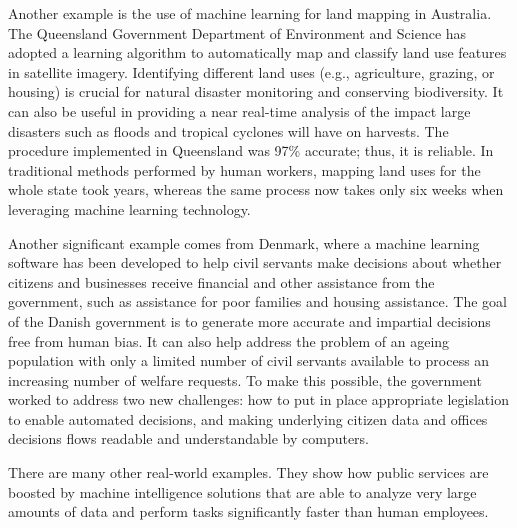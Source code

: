 Another example is the use of machine learning for land mapping in Australia. The Queensland Government Department of Environment and Science has adopted a learning algorithm to automatically map and classify land use features in satellite imagery. Identifying different land uses (e.g., agriculture, grazing, or housing) is crucial for natural disaster monitoring and conserving biodiversity. It can also be useful in providing a near real-time analysis of the impact large disasters such as floods and tropical cyclones will have on harvests. The procedure implemented in Queensland was 97\% accurate; thus, it is reliable. In traditional methods performed by human workers, mapping land uses for the whole state took years, whereas the same process now takes only six weeks when leveraging machine learning technology.

Another significant example comes from Denmark, where a machine learning software has been developed to help civil servants make decisions about whether citizens and businesses receive financial and other assistance from the government, such as assistance for poor families and housing assistance. The goal of the Danish government is to generate more accurate and impartial decisions free from human bias. It can also help address the problem of an ageing population with only a limited number of civil servants available to process an increasing number of welfare requests. To make this possible, the government worked to address two new challenges: how to put in place appropriate legislation to enable automated decisions, and making underlying citizen data and offices decisions flows readable and understandable by computers.

There are many other real-world examples. They show how public services are boosted by machine intelligence solutions that are able to analyze very large amounts of data and perform tasks significantly faster than human employees.


